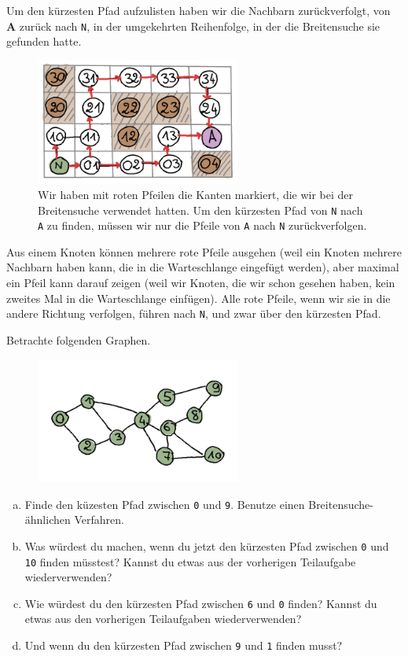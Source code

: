Um den kürzesten Pfad aufzulisten haben wir die Nachbarn zurückverfolgt, von \textbf{A} zurück nach \texttt{N}, in der umgekehrten Reihenfolge, in der die Breitensuche sie gefunden hatte.
\begin{figure}[H]
    \centering
    \includegraphics[width=0.6\textwidth]{Pictures/SP/norbert_klein_graph_arrows.png}
    \caption{Wir haben mit roten Pfeilen die Kanten markiert, die wir bei der Breitensuche verwendet hatten. Um den kürzesten Pfad von \texttt{N} nach \texttt{A} zu finden, müssen wir nur die Pfeile von \texttt{A} nach \texttt{N} zurückverfolgen.}
    \label{fig:norbert_klein_graph_arrows}
\end{figure}
Aus einem Knoten können mehrere rote Pfeile ausgehen (weil ein Knoten mehrere Nachbarn haben kann, die in die Warteschlange eingefügt werden), aber maximal ein Pfeil kann darauf zeigen (weil wir Knoten, die wir schon gesehen haben, kein zweites Mal in die Warteschlange einfügen). Alle rote Pfeile, wenn wir sie in die andere Richtung verfolgen, führen nach \texttt{N}, und zwar über den kürzesten Pfad.

\begin{aufgabe}\label{aufgabe_find_shortest_path}
Betrachte folgenden Graphen. 
\begin{figure}[H]
    \centering
    \includegraphics[width=0.6\textwidth]{Pictures/SP/shortest_path_graph.png}
\end{figure}
\begin{enumerate}[(a)]
    \item Finde den küzesten Pfad zwischen \texttt{0} und \texttt{9}. Benutze einen Breitensuche-ähnlichen Verfahren.
    \item Was würdest du machen, wenn du jetzt den kürzesten Pfad zwischen \texttt{0} und \texttt{10} finden müsstest? Kannst du etwas aus der vorherigen Teilaufgabe wiederverwenden?
    \item Wie würdest du den kürzesten Pfad zwischen \texttt{6} und \texttt{0} finden? Kannst du etwas aus den vorherigen Teilaufgaben wiederverwenden?
    \item Und wenn du den kürzesten Pfad zwischen \texttt{9} und \texttt{1} finden musst?
\end{enumerate}{}
\end{aufgabe}

